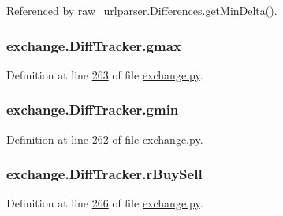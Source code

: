Referenced by \hyperlink{raw__urlparser_8py_source_l00094}{raw\+\_\+urlparser.\+Differences.\+get\+Min\+Delta()}.

\subsubsection[{\texorpdfstring{gmax}{gmax}}]{\setlength{\rightskip}{0pt plus 5cm}exchange.\+Diff\+Tracker.\+gmax}\hypertarget{classexchange_1_1_diff_tracker_a73f20240fb1d81a320a6f78aec022529}{}\label{classexchange_1_1_diff_tracker_a73f20240fb1d81a320a6f78aec022529}


Definition at line \hyperlink{exchange_8py_source_l00263}{263} of file \hyperlink{exchange_8py_source}{exchange.\+py}.

\subsubsection[{\texorpdfstring{gmin}{gmin}}]{\setlength{\rightskip}{0pt plus 5cm}exchange.\+Diff\+Tracker.\+gmin}\hypertarget{classexchange_1_1_diff_tracker_a8c2277408ff52d5bb8913a98f4efe8b0}{}\label{classexchange_1_1_diff_tracker_a8c2277408ff52d5bb8913a98f4efe8b0}


Definition at line \hyperlink{exchange_8py_source_l00262}{262} of file \hyperlink{exchange_8py_source}{exchange.\+py}.

\subsubsection[{\texorpdfstring{r\+Buy\+Sell}{rBuySell}}]{\setlength{\rightskip}{0pt plus 5cm}exchange.\+Diff\+Tracker.\+r\+Buy\+Sell}\hypertarget{classexchange_1_1_diff_tracker_aab406fe7b4dc6d486c4a9fb65944a4df}{}\label{classexchange_1_1_diff_tracker_aab406fe7b4dc6d486c4a9fb65944a4df}


Definition at line \hyperlink{exchange_8py_source_l00266}{266} of file \hyperlink{exchange_8py_source}{exchange.\+py}.

